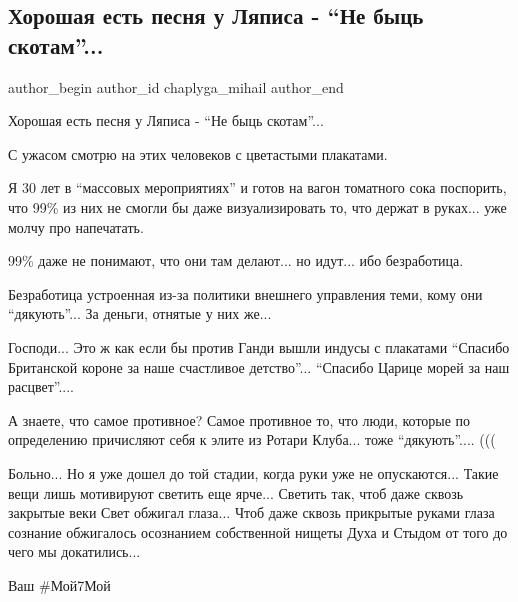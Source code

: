  
 
 
 
 
 
\subsection{Хорошая есть песня у Ляписа - \enquote{Не быць скотам}...}
\label{sec:31_01_2022.fb.chaplyga_mihail.1.ne_byc_skotami}
 
\ifcmt
 author_begin
   author_id chaplyga_mihail
 author_end
\fi

Хорошая есть песня у Ляписа - \enquote{Не быць скотам}...

С ужасом смотрю на этих человеков с цветастыми плакатами. 

Я 30 лет в \enquote{массовых мероприятиях} и готов на вагон томатного сока поспорить,
что 99\% из них не смогли бы даже визуализировать то, что держат в руках... уже
молчу про напечатать. 


99\% даже не понимают, что они там делают... но идут... ибо безработица.

Безработица устроенная из-за политики внешнего управления теми, кому они
\enquote{дякують}... За деньги, отнятые у них же...

Господи... Это ж как если бы против Ганди вышли индусы с плакатами \enquote{Спасибо
Британской короне за наше счастливое детство}... \enquote{Спасибо Царице морей за наш
расцвет}....

А знаете, что самое противное? Самое противное то, что люди, которые по
определению причисляют себя к элите из Ротари Клуба... тоже \enquote{дякують}.... (((

Больно... Но я уже дошел до той стадии, когда руки уже не опускаются... Такие
вещи лишь мотивируют светить еще ярче... Светить так, чтоб даже сквозь закрытые
веки Свет обжигал глаза... Чтоб даже сквозь прикрытые руками глаза сознание
обжигалось осознанием собственной нищеты Духа и Стыдом от того до чего мы
докатились...

Ваш \#Мой7Мой
